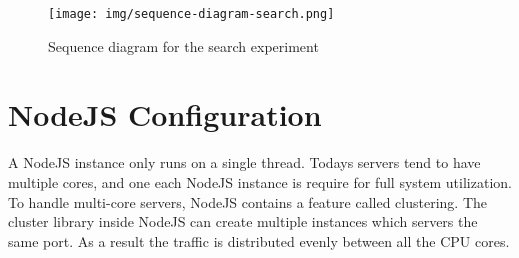 \begin{figure}[h!]
\centering \texttt{[image: img/sequence-diagram-search.png]}
\caption{Sequence diagram for the search experiment}
\label{fig:sequence-diagram-search}
\end{figure}

\section{NodeJS Configuration}
A NodeJS instance only runs on a single thread.
Todays servers tend to have multiple cores, and one each NodeJS instance is require for full system utilization.
To handle multi-core servers, NodeJS contains a feature called clustering.
The cluster library  inside NodeJS can create multiple instances which servers the same port.
As a result the traffic is distributed evenly between all the CPU cores.
